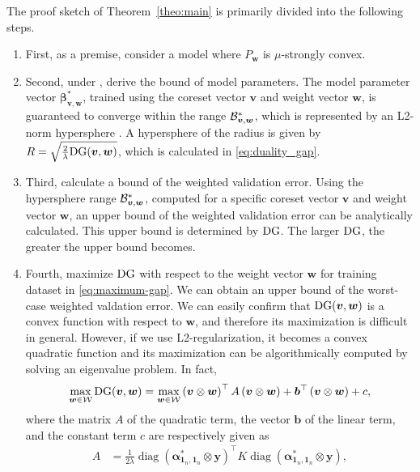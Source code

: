 The proof sketch of Theorem~\ref{theo:main} is primarily divided into the following steps.

\begin{enumerate}
  \item
  First, as a premise, consider a model where $P_{\boldsymbol{w}}$ is $\mu$-strongly convex.
  \item
  Second, under , derive the bound of model parameters. The model parameter vector ${\bm \beta}^*_{\bm v, \bm w}$, trained using the coreset vector $\bm v$ and weight vector $\bm w$, is guaranteed to converge within the range ${\cal B}^*_{\bm v, \bm w}$, which is represented by an L2-norm hypersphere \citep{10.1162/neco_a_01619}. 
  A hypersphere of the radius is given by $R = \sqrt{\frac{2}{\lambda}{\rm DG}(\bm v, \bm w)}$, which is calculated in \eqref{eq:duality_gap}.
  \item
  Third, calculate a bound of the weighted validation error.
  Using the hypersphere range ${\cal B}^*_{\bm v, \bm w}$, computed for a specific coreset vector $\bm v$ and weight vector $\bm w$, an upper bound of the weighted validation error can be analytically calculated.
  This upper bound is determined by ${\rm DG}$. The larger ${\rm DG}$, the greater the upper bound becomes.
  \item
  Fourth, maximize ${\rm DG}$ with respect to the weight vector $\bm w$ for training dataset in \eqref{eq:maximum-gap}. We can obtain an upper bound of the worst-case weighted valdation error.
		We can easily confirm that ${\rm DG}(\bm v, \bm w)$ is a convex function with respect to $\bm w$,
		and therefore its maximization is difficult in general.
		However, if we use L2-regularization, it becomes a convex quadratic function and its maximization
		can be algorithmically computed by solving an eigenvalue problem. In fact,
		\begin{align}  
		\label{eq:maximum-gap}  
		\max_{\bm w \in {\mathcal W}} {\rm DG}(\bm v, \bm w) =  
		\max_{\bm w \in {\mathcal W}}  
		\left(\boldsymbol{v} \otimes \boldsymbol{w}\right)^{\top} A \left(\boldsymbol{v} \otimes \boldsymbol{w}\right) + \boldsymbol{b}^{\top}\left(\boldsymbol{v} \otimes \boldsymbol{w}\right) + c,  
		\end{align}  
		where the matrix $ A $ of the quadratic term, the vector $ \bm b $ of the linear term, and the constant term $ c $ are respectively given as  
		\begin{align*}  
		A  
		&=  
		\frac{1}{2\lambda} \operatorname{diag}(\bm\alpha_{\bm 1_n, \bm 1_n}^* \otimes \boldsymbol{y})^{\top} K \operatorname{diag}(\bm\alpha_{\bm 1_n, \bm 1_n}^* \otimes \boldsymbol{y}),  

\end{align*}
\end{enumerate}
